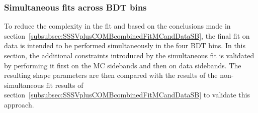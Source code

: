 \clearpage

\subsubsection{Simultaneous fits across BDT bins}
\label{subsubsec:SimultaneousSSSVplusCOMBcombinedFitMCandDataSB}

To reduce the complexity in the fit and based on the conclusions made in section~\ref{subsubsec:SSSVplusCOMBcombinedFitMCandDataSB}, the final fit on data is intended to be performed simultaneously in the four BDT bins. In this section, the additional constraints introduced by the simultaneous fit is validated by performing it first on the \bbmumuX MC sidebands and then on data sidebands. The resulting shape parameters are then compared with the results of the non-simultaneous fit results of section~\ref{subsubsec:SSSVplusCOMBcombinedFitMCandDataSB} to validate this approach.

